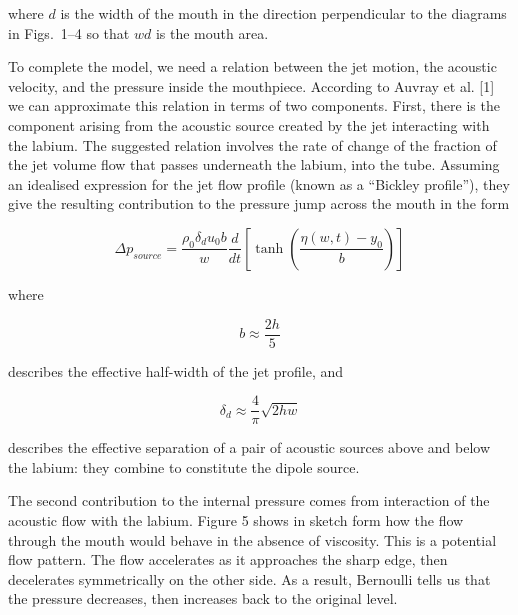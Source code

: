   \noindent{}where $d$ is the width of the mouth in the direction perpendicular 
  to the diagrams in Figs.\ 1--4 so that $wd$ is the mouth area. 

  To complete the model, we need a relation between the jet motion, the 
  acoustic velocity, and the pressure inside the mouthpiece. According to 
  Auvray et al. [1] we can approximate this relation in terms of two 
  components. First, there is the component arising from the acoustic source 
  created by the jet interacting with the labium. The suggested relation 
  involves the rate of change of the fraction of the jet volume flow that 
  passes underneath the labium, into the tube. Assuming an idealised expression 
  for the jet flow profile (known as a ``Bickley profile''), they give the 
  resulting contribution to the pressure jump across the mouth in the form 

  \begin{equation*}\Delta p_{source}=\dfrac{\rho_0 \delta_d u_0 b}{w} 
  \dfrac{d}{dt} \left[ \tanh \left( \dfrac{\eta(w,t)-y_0}{b} \right) \right] 
  \tag{6}\end{equation*} 

  \noindent{}where 

  \begin{equation*}b \approx \dfrac{2h}{5} \tag{7}\end{equation*} 

  \noindent{}describes the effective half-width of the jet profile, and 

  \begin{equation*}\delta_d \approx \dfrac{4}{\pi}\sqrt{2 h w} 
  \tag{8}\end{equation*} 

  \noindent{}describes the effective separation of a pair of acoustic sources 
  above and below the labium: they combine to constitute the dipole source. 

  The second contribution to the internal pressure comes from interaction of 
  the acoustic flow with the labium. Figure 5 shows in sketch form how the flow 
  through the mouth would behave in the absence of viscosity. This is a 
  potential flow pattern. The flow accelerates as it approaches the sharp edge, 
  then decelerates symmetrically on the other side. As a result, Bernoulli 
  tells us that the pressure decreases, then increases back to the original 
  level. 


